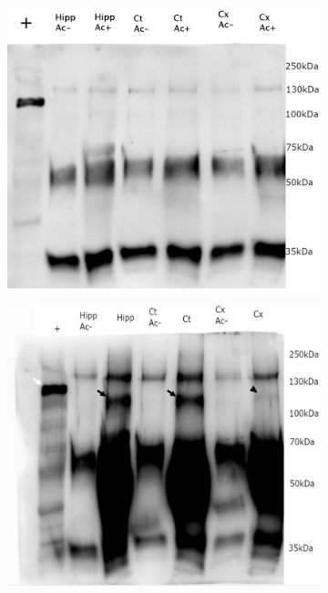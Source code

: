 	\begin{figure}[h]
		\begin{center}
			\begin{subfigure}[h]{0.49\textwidth}
				\caption{}
				\label{fig:WB-anti-LC}
				\includegraphics[width=\textwidth]{./Images/WB/@LC_MuSK_30'.jpg} %
			\end{subfigure}
			\begin{subfigure}[h]{0.49\textwidth}
				\caption{}
				\label{fig:WBbon}
				\includegraphics[width=\textwidth]{./Images/WB/2018-04-09.jpg} %

\end{subfigure}
\end{center}
\end{figure}
